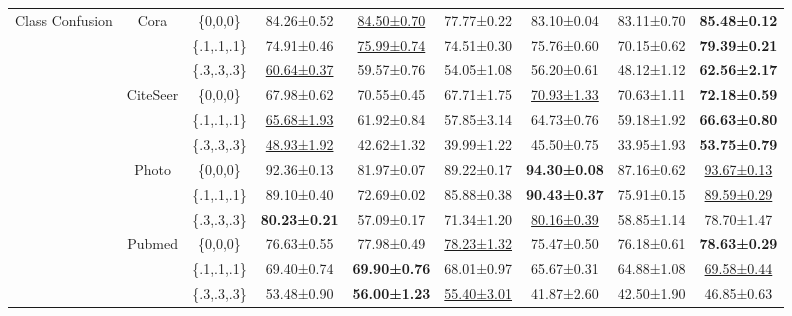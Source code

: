 \documentclass[sigconf, anonymous, review]{acmart}
\begin{document}
\begin{table}
{\begin{tabular}{ccccccccc}
    \midrule
    \multirow{12}{*}{Class Confusion} & \multirow{3}{*}{Cora} &\{0,0,0\}&84.26±0.52&\underline{84.50±0.70}&77.77±0.22&83.10±0.04&83.11±0.70&\textbf{85.48±0.12}\\
    &  &\{.1,.1,.1\}&74.91±0.46 &\underline{75.99±0.74}&74.51±0.30&75.76±0.60&70.15±0.62 &\textbf{79.39±0.21}  \\
    &  &\{.3,.3,.3\}&\underline{60.64±0.37}&59.57±0.76&54.05±1.08&56.20±0.61&48.12±1.12&\textbf{62.56±2.17}\\
    & \multirow{3}{*}{CiteSeer} &\{0,0,0\}&67.98±0.62 &70.55±0.45&67.71±1.75&\underline{70.93±1.33}&70.63±1.11 & \textbf{72.18±0.59} \\
    &  &\{.1,.1,.1\}&\underline{65.68±1.93}&61.92±0.84&57.85±3.14&64.73±0.76&59.18±1.92&\textbf{66.63±0.80}\\
    &  &\{.3,.3,.3\}&\underline{48.93±1.92}&42.62±1.32&39.99±1.22&45.50±0.75&33.95±1.93 & \textbf{53.75±0.79} \\
    & \multirow{3}{*}{Photo} &\{0,0,0\}&92.36±0.13&81.97±0.07&89.22±0.17&\textbf{94.30±0.08}&87.16±0.62&\underline{93.67±0.13}\\
    &  &\{.1,.1,.1\}&89.10±0.40 &72.69±0.02&85.88±0.38&\textbf{90.43±0.37}&75.91±0.15 & \underline{89.59±0.29} \\
    &  &\{.3,.3,.3\}&\textbf{80.23±0.21}&57.09±0.17&71.34±1.20&\underline{80.16±0.39}&58.85±1.14&78.70±1.47\\
    & \multirow{3}{*}{Pubmed} &\{0,0,0\}&76.63±0.55&77.98±0.49&\underline{78.23±1.32}&75.47±0.50&76.18±0.61&\textbf{78.63±0.29}\\
    &  &\{.1,.1,.1\}&69.40±0.74&\textbf{69.90±0.76}&68.01±0.97&65.67±0.31&64.88±1.08&\underline{69.58±0.44}\\
    &  &\{.3,.3,.3\}&53.48±0.90&\textbf{56.00±1.23}&\underline{55.40±3.01}&41.87±2.60&42.50±1.90&46.85±0.63\\
    \bottomrule
  \end{tabular}}
  \label{tab:performence_dtn_app}
\end{table}
\end{document}
